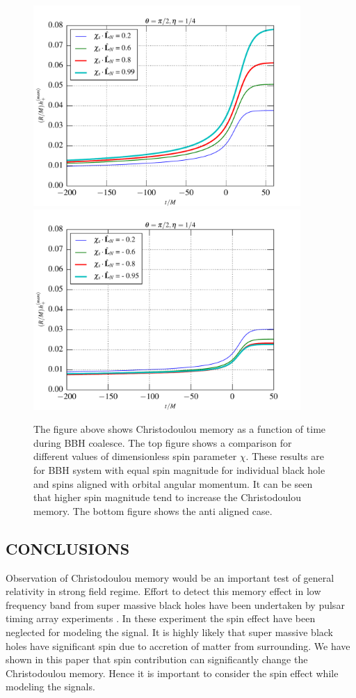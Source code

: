 \documentclass[twocolumn,showpacs,aps,prd,nobibnotes,floatfix]{revtex4-1}
\begin{document}
\begin{figure}
	\includegraphics[width=4.0in]{../plots/MemoryPlot_AlignedSpinSXSdata/0p99.pdf}
	\includegraphics[width=4.0in]{../plots/MemoryPlot_AntialignedSpinSXSdata/m0p94.pdf}
	\caption{The figure above shows Christodoulou memory as a function of time during BBH coalesce. The top figure shows a comparison for different values of dimensionless spin parameter $\chi$. These results are for BBH system with equal spin magnitude for individual black hole and spins aligned with orbital angular momentum. It can be seen that higher spin magnitude tend to increase the Christodoulou memory. The bottom figure shows the anti aligned case.  }
	\label{fig:differntchivalues}
\end{figure}

\subsection{CONCLUSIONS}
Observation of Christodoulou memory would be an important test of general relativity in strong field regime. Effort to detect this memory effect in low frequency band from super massive black holes have been undertaken by pulsar timing array experiments \cite{Pshirkov2010}. In these experiment the spin effect have been neglected for modeling the signal. It is highly likely that super massive black holes have significant spin due to accretion of matter from surrounding. We have shown in this paper that spin contribution can significantly change the Christodoulou memory. Hence it is important to consider the spin effect while modeling the signals.
\end{document}
